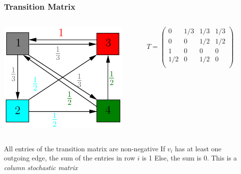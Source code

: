 \documentclass{beamer}
\begin{document}
\begin{frame}
\frametitle{Transition Matrix}
\begin{columns}
    \begin{column}{0.5\textwidth}
        \centering
        \includegraphics[width=\textwidth]{weighted.png}
    \end{column}
    \begin{column}{0.5\textwidth}
        \centering
        $T = \begin{pmatrix}
            0 & 1/3 & 1/3 & 1/3\\
            0 & 0 & 1/2 & 1/2\\
            1 & 0 & 0 & 0\\
            1/2 & 0 & 1/2 & 0\\
        \end{pmatrix}$
    \end{column}
\end{columns}
\begin{outline}
    \1 All entries of the transition matrix are non-negative
    \1 If $v_i$ has at least one outgoing edge, the sum of the entries in row $i$ is 1
        \2 Else, the sum is 0.
    \1 This is a \emph{column stochastic matrix}
\end{outline}
\end{frame}
\end{document}

